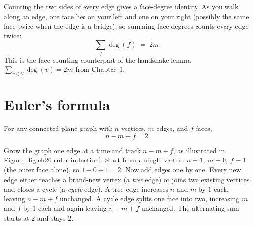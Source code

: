 Counting the two sides of every edge gives a face-degree identity. As you walk along an
edge, one face lies on your left and one on your right (possibly the same face twice when
the edge is a bridge), so summing face degrees counts every edge twice:
\[
  \sum_{f} \deg(f) \;=\; 2m. \tag{$\star$}
\]
This is the face-counting counterpart of the handshake lemma $\sum_{v \in V} \deg(v)=2m$
from Chapter~1.

\section{Euler's formula}
\label{ch26:euler}

\begin{theorem}
\label{ch26:thm-euler}
For any connected plane graph with $n$ vertices, $m$ edges, and $f$ faces,
\[
  n - m + f = 2.
\]
\end{theorem}

\begin{intuitionbox}
Grow the graph one edge at a time and track $n - m + f$, as illustrated in
Figure~\ref{fig:ch26-euler-induction}. Start from a single vertex: $n=1$, $m=0$, $f=1$
(the outer face alone), so $1-0+1=2$. Now add edges one by one. Every new edge either
reaches a brand-new vertex (a \emph{tree} edge) or joins two existing vertices and closes
a cycle (a \emph{cycle} edge). A tree edge increases $n$ and $m$ by $1$ each, leaving
$n-m+f$ unchanged. A cycle edge splits one face into two, increasing $m$ and $f$ by $1$
each and again leaving $n-m+f$ unchanged. The alternating sum starts at $2$ and stays $2$.
\end{intuitionbox}

